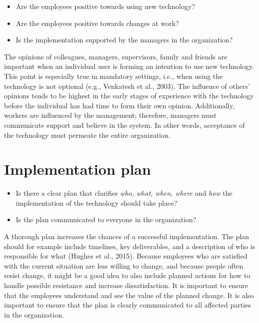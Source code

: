 \documentclass[
  12pt,
]{scrbook}
\begin{document}
\begin{itemize}
\item
  Are the employees positive towards using new technology?
\item
  Are the employees positive towards changes at work?
\item
  Is the implementation supported by the managers in the organization?
\end{itemize}

The opinions of colleagues, managers, supervisors, family and friends are important when an individual user is forming an intention to use new technology. This point is especially true in mandatory settings, i.e., when using the technology is not optional (e.g., Venkatesh et al., 2003). The influence of others' opinions tends to be highest in the early stages of experience with the technology before the individual has had time to form their own opinion. Additionally, workers are influenced by the management; therefore, managers must communicate support and believe in the system. In other words, acceptance of the technology must permeate the entire organization.

\hypertarget{implementation-plan}{%
\section*{Implementation plan}\label{implementation-plan}}

\begin{itemize}
\item
  Is there a clear plan that clarifies \emph{who, what, when, where} and \emph{how} the implementation of the technology should take place?
\item
  Is the plan communicated to everyone in the organization?
\end{itemize}

A thorough plan increases the chances of a successful implementation. The plan should for example include timelines, key deliverables, and a description of who is responsible for what (Hughes et al., 2015). Because employees who are satisfied with the current situation are less willing to change, and because people often resist change, it might be a good idea to also include planned actions for how to handle possible resistance and increase dissatisfaction. It is important to ensure that the employees understand and see the value of the planned change. It is also important to ensure that the plan is clearly communicated to all affected parties in the organization.~
\end{document}

